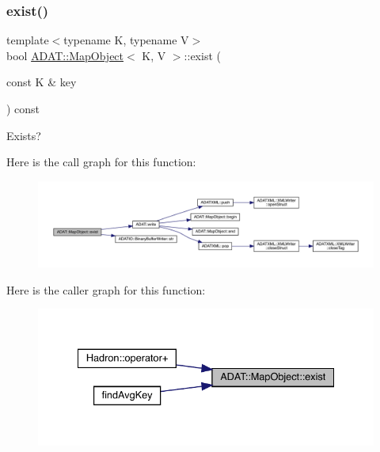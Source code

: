 \subsubsection{\texorpdfstring{exist()}{exist()}\hspace{0.1cm}{\footnotesize\ttfamily [1/2]}}
{\footnotesize\ttfamily template$<$typename K, typename V$>$ \\
bool \mbox{\hyperlink{classADAT_1_1MapObject}{A\+D\+A\+T\+::\+Map\+Object}}$<$ K, V $>$\+::exist (\begin{DoxyParamCaption}\item[{const K \&}]{key }\end{DoxyParamCaption}) const\hspace{0.3cm}{\ttfamily [inline]}}



Exists? 

Here is the call graph for this function\+:
\nopagebreak
\begin{figure}[H]
\begin{center}
\leavevmode
\includegraphics[width=350pt]{da/d29/classADAT_1_1MapObject_a1d22f979e34bda97c3dc89d5fc937d3b_cgraph}
\end{center}
\end{figure}
Here is the caller graph for this function\+:\nopagebreak
\begin{figure}[H]
\begin{center}
\leavevmode
\includegraphics[width=334pt]{da/d29/classADAT_1_1MapObject_a1d22f979e34bda97c3dc89d5fc937d3b_icgraph}
\end{center}
\end{figure}
\mbox{\label{classADAT_1_1MapObject_a1d22f979e34bda97c3dc89d5fc937d3b}} 
